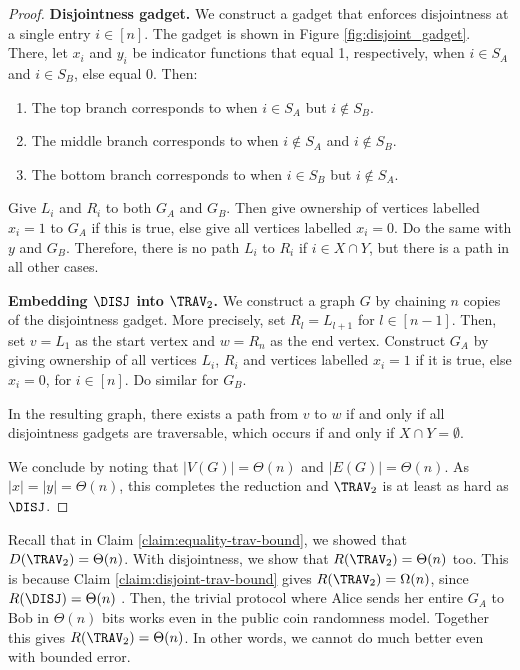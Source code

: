 \begin{proof}
\textbf{Disjointness gadget.}
We construct a gadget that enforces disjointness at a single entry $i \in [n]$. The gadget is shown in Figure \ref{fig:disjoint_gadget}. There, let $x_i$ and $y_i$ be indicator functions that equal 1, respectively, when $i \in S_A$ and $i \in S_B$, else equal 0. Then:
\begin{enumerate}
    \item The top branch corresponds to when $i \in S_A$ but $i \notin S_B$.
    \item The middle branch corresponds to when $i \notin S_A$ and $i \notin S_B$.
    \item The bottom branch corresponds to when $i \in S_B$ but $i \notin S_A$.
\end{enumerate}
Give $L_i$ and $R_i$ to both $G_A$ and $G_B$. Then give ownership of vertices labelled $x_i = 1$ to $G_A$ if this is true, else give all vertices labelled $x_i = 0$. Do the same with $y$ and $G_B$. Therefore, there is no path $L_i$ to $R_i$ if $i \in X \cap Y$, but there is a path in all other cases.



\textbf{Embedding $\DISJ$ into $\TRAV_2$.}
We construct a graph $G$ by chaining $n$ copies of the disjointness gadget. More precisely, set $R_l = L_{l+1}$ for $l \in [n-1]$. Then, set $v = L_1$ as the start vertex and $w = R_n$ as the end vertex. Construct $G_A$ by giving ownership of all vertices $L_i$, $R_i$ and vertices labelled $x_i = 1$ if it is true, else $x_i = 0$, for $i \in [n]$. Do similar for $G_B$.

In the resulting graph, there exists a path from $v$ to $w$ if and only if all disjointness gadgets are traversable, which occurs if and only if $X \cap Y = \emptyset$.



We conclude by noting that $|V(G)| = \Theta(n)$ and $|E(G)| = \Theta(n)$. As $|x| = |y| = \Theta(n)$, this completes the reduction and $\TRAV_2$ is at least as hard as $\DISJ$.
\end{proof}

Recall that in Claim \ref{claim:equality-trav-bound}, we showed that $D(\TRAV_2) = \Theta(n)$. With disjointness, we show that $R(\TRAV_2) = \Theta(n)$ too. This is because Claim \ref{claim:disjoint-trav-bound} gives $R(\TRAV_2) = \Omega(n)$, since $R(\DISJ) = \Theta(n)$ \parencite{RaoYehudayoffBook}. Then, the trivial protocol where Alice sends her entire $G_A$ to Bob in $\Theta(n)$ bits works even in the public coin randomness model. Together this gives $R(\TRAV_2) = \Theta(n)$. In other words, we cannot do much better even with bounded error.
